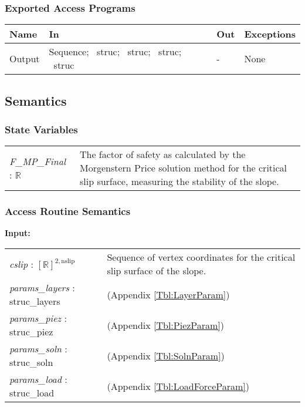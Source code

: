 \documentclass[12pt, titlepage]{article}
\begin{document}
\subsubsection{Exported Access Programs}
\renewcommand*{\arraystretch}{1.5}
\begin{tabular}{| p{} | p{} | 
p{} | p{} |} \hline 

  \textbf{Name} & \textbf{In} & \textbf{Out} & \textbf{Exceptions}
  \\ \hline

  Output & Sequence; ~\newline struc; ~\newline struc; ~\newline struc;
  ~\newline struc & - & None \\ \hline

\end{tabular}

\subsection{Semantics}

\subsubsection{State Variables}
\renewcommand{\arraystretch}{1.5}
\begin{longtable}{p{} p{}}
  \textit{F\_MP\_Final} : $\mathbb{R}$ & The factor of safety as
  calculated by the Morgenstern Price solution method for the
  critical slip surface, measuring the stability of the slope. \\
\end{longtable}

\subsubsection{Access Routine Semantics}
\textbf{Input:}
\renewcommand*{\arraystretch}{1.5}
\begin{longtable}{p{} p{}}
  \textit{cslip} : $[\mathbb{R}]^{2,\text{nslip}}$ & Sequence of
  vertex coordinates for the critical slip surface of the slope. \\
  
  \textit{params\_layers} : struc\_layers & (Appendix \ref{Tbl:LayerParam})\\
  
  \textit{params\_piez} : struc\_piez & (Appendix \ref{Tbl:PiezParam})\\

  \textit{params\_soln} : struc\_soln & (Appendix \ref{Tbl:SolnParam})\\
  
  \textit{params\_load} : struc\_load & (Appendix
  \ref{Tbl:LoadForceParam})\\
\end{longtable}
\end{document}
